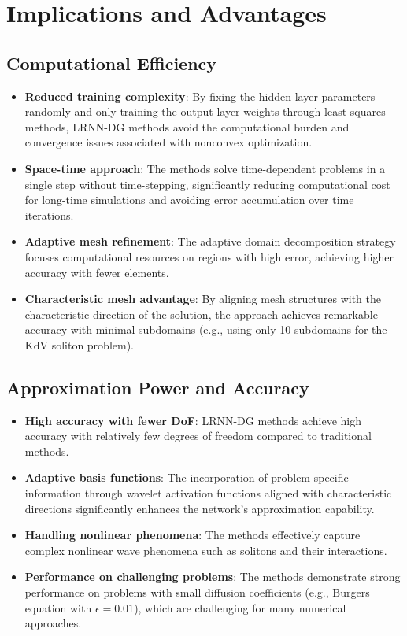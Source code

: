 \documentclass[11pt,a4paper]{article}
\begin{document}
\section{Implications and Advantages}

\subsection{Computational Efficiency}

\begin{itemize}
    \item \textbf{Reduced training complexity}: By fixing the hidden layer parameters randomly and only training the output layer weights through least-squares methods, LRNN-DG methods avoid the computational burden and convergence issues associated with nonconvex optimization.
    
    \item \textbf{Space-time approach}: The methods solve time-dependent problems in a single step without time-stepping, significantly reducing computational cost for long-time simulations and avoiding error accumulation over time iterations.
    
    \item \textbf{Adaptive mesh refinement}: The adaptive domain decomposition strategy focuses computational resources on regions with high error, achieving higher accuracy with fewer elements.
    
    \item \textbf{Characteristic mesh advantage}: By aligning mesh structures with the characteristic direction of the solution, the approach achieves remarkable accuracy with minimal subdomains (e.g., using only 10 subdomains for the KdV soliton problem).
\end{itemize}

\subsection{Approximation Power and Accuracy}

\begin{itemize}
    \item \textbf{High accuracy with fewer DoF}: LRNN-DG methods achieve high accuracy with relatively few degrees of freedom compared to traditional methods.
    
    \item \textbf{Adaptive basis functions}: The incorporation of problem-specific information through wavelet activation functions aligned with characteristic directions significantly enhances the network's approximation capability.
    
    \item \textbf{Handling nonlinear phenomena}: The methods effectively capture complex nonlinear wave phenomena such as solitons and their interactions.
    
    \item \textbf{Performance on challenging problems}: The methods demonstrate strong performance on problems with small diffusion coefficients (e.g., Burgers equation with $\epsilon = 0.01$), which are challenging for many numerical approaches.
\end{itemize}
\end{document}
